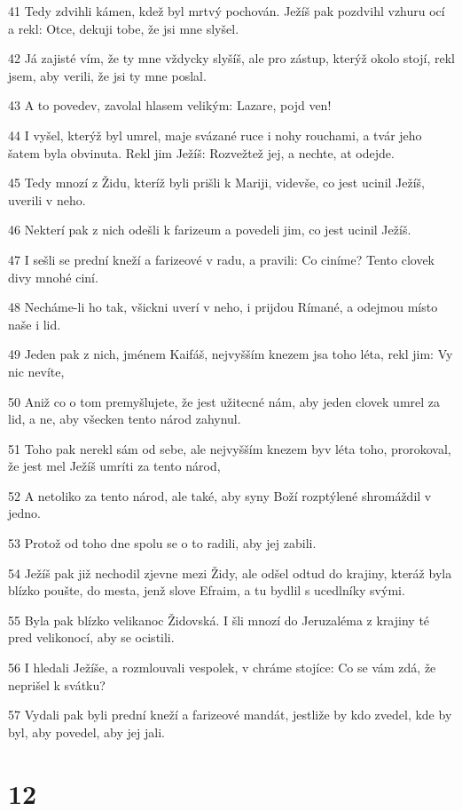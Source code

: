 \par 41 Tedy zdvihli kámen, kdež byl mrtvý pochován. Ježíš pak pozdvihl vzhuru ocí a rekl: Otce, dekuji tobe, že jsi mne slyšel.
\par 42 Já zajisté vím, že ty mne vždycky slyšíš, ale pro zástup, kterýž okolo stojí, rekl jsem, aby verili, že jsi ty mne poslal.
\par 43 A to povedev, zavolal hlasem velikým: Lazare, pojd ven!
\par 44 I vyšel, kterýž byl umrel, maje svázané ruce i nohy rouchami, a tvár jeho šatem byla obvinuta. Rekl jim Ježíš: Rozvežtež jej, a nechte, at odejde.
\par 45 Tedy mnozí z Židu, kteríž byli prišli k Mariji, videvše, co jest ucinil Ježíš, uverili v neho.
\par 46 Nekterí pak z nich odešli k farizeum a povedeli jim, co jest ucinil Ježíš.
\par 47 I sešli se prední kneží a farizeové v radu, a pravili: Co ciníme? Tento clovek divy mnohé ciní.
\par 48 Necháme-li ho tak, všickni uverí v neho, i prijdou Rímané, a odejmou místo naše i lid.
\par 49 Jeden pak z nich, jménem Kaifáš, nejvyšším knezem jsa toho léta, rekl jim: Vy nic nevíte,
\par 50 Aniž co o tom premyšlujete, že jest užitecné nám, aby jeden clovek umrel za lid, a ne, aby všecken tento národ zahynul.
\par 51 Toho pak nerekl sám od sebe, ale nejvyšším knezem byv léta toho, prorokoval, že jest mel Ježíš umríti za tento národ,
\par 52 A netoliko za tento národ, ale také, aby syny Boží rozptýlené shromáždil v jedno.
\par 53 Protož od toho dne spolu se o to radili, aby jej zabili.
\par 54 Ježíš pak již nechodil zjevne mezi Židy, ale odšel odtud do krajiny, kteráž byla blízko poušte, do mesta, jenž slove Efraim, a tu bydlil s ucedlníky svými.
\par 55 Byla pak blízko velikanoc Židovská. I šli mnozí do Jeruzaléma z krajiny té pred velikonocí, aby se ocistili.
\par 56 I hledali Ježíše, a rozmlouvali vespolek, v chráme stojíce: Co se vám zdá, že neprišel k svátku?
\par 57 Vydali pak byli prední kneží a farizeové mandát, jestliže by kdo zvedel, kde by byl, aby povedel, aby jej jali.

\chapter{12}

